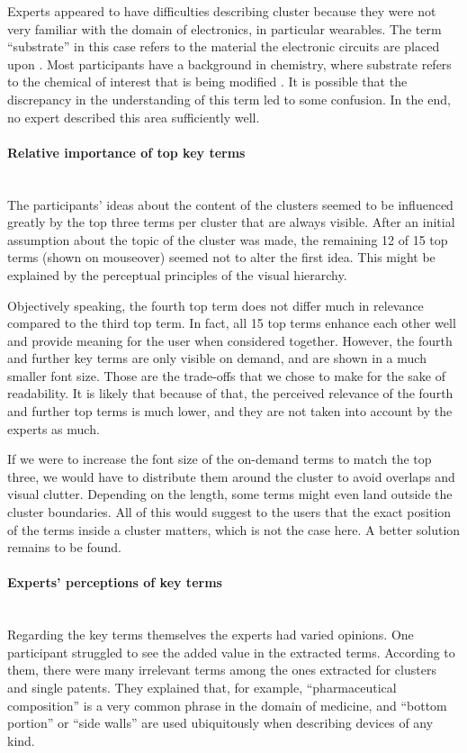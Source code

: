 Experts appeared to have difficulties describing cluster  because they were not very familiar with the domain of electronics, in particular wearables.
The term ``substrate'' in this case refers to the material the electronic circuits are placed upon .
Most participants have a background in chemistry, where substrate refers to the chemical of interest that is being modified \cite{mcnaught1997compendium}.
It is possible that the discrepancy in the understanding of this term led to some confusion.
In the end, no expert described this area sufficiently well.

\paragraph{Relative importance of top key terms}~\\
The participants' ideas about the content of the clusters seemed to be influenced greatly by the top three terms per cluster that are always visible.
After an initial assumption about the topic of the cluster was made, the remaining 12 of 15 top terms (shown on mouseover) seemed not to alter the first idea.
This might be explained by the perceptual principles of the visual hierarchy.

Objectively speaking, the fourth top term does not differ much in relevance compared to the third top term.
In fact, all 15 top terms enhance each other well and provide meaning for the user when considered together.
However, the fourth and further key terms are only visible on demand, and are shown in a much smaller font size.
Those are the trade-offs that we chose to make for the sake of readability.
It is likely that because of that, the perceived relevance of the fourth and further top terms is much lower, and they are not taken into account by the experts as much.

If we were to increase the font size of the on-demand terms to match the top three, we would have to distribute them around the cluster to avoid overlaps and visual clutter. 
Depending on the length, some terms might even land outside the cluster boundaries.
All of this would suggest to the users that the exact position of the terms inside a cluster matters, which is not the case here.
A better solution remains to be found.

\paragraph{Experts' perceptions of key terms}~\\
Regarding the key terms themselves the experts had varied opinions.
One participant struggled to see the added value in the extracted terms.
According to them, there were many irrelevant terms among the ones extracted for clusters and single patents.
They explained that, for example, ``pharmaceutical composition'' is a very common phrase in the domain of medicine, and ``bottom portion'' or ``side walls'' are used ubiquitously when describing devices of any kind.

